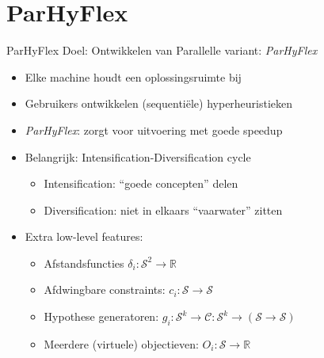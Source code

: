 \documentclass[handout]{beamer}
\newcommand{\sol}{\mathcal{S}}
\newcommand{\constr}{\mathcal{C}}
\newcommand{\RR}{\mathbb{R}}
\begin{document}
\section{ParHyFlex}
\begin{frame}{ParHyFlex}
Doel: Ontwikkelen van Parallelle variant: \emph{ParHyFlex}
\begin{itemize}[<+->]
 \item Elke machine houdt een oplossingsruimte bij
 \item Gebruikers ontwikkelen (sequenti\"ele) hyperheuristieken
 \item \emph{ParHyFlex}: zorgt voor uitvoering met goede speedup
 \item Belangrijk: Intensification-Diversification cycle
 \begin{itemize}[<+->]
  \item Intensification: ``goede concepten'' delen
  \item Diversification: niet in elkaars ``vaarwater'' zitten
 \end{itemize}
 \item Extra low-level features:
 \begin{itemize}[<+->]
  \item Afstandsfuncties $\delta_i:\sol^2\rightarrow\RR$
  \item Afdwingbare constraints: $c_i:\sol\rightarrow\sol$
  \item Hypothese generatoren: $g_i:\sol^k\rightarrow\constr:\sol^k\rightarrow\left(\sol\rightarrow\sol\right)$
  \item Meerdere (virtuele) objectieven: $O_i:\sol\rightarrow\RR$
 \end{itemize}
\end{itemize}
\end{frame}
\end{document}
